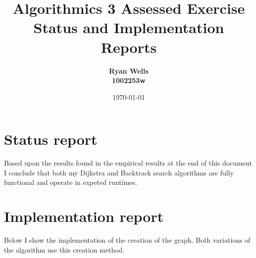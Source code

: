 \documentclass{article}
\title{Algorithmics 3 Assessed Exercise\\ 
Status and Implementation Reports}
\author{\bf Ryan Wells\\ \bf 1002253w}
\date{\today}
\begin{document}
\maketitle
\thispagestyle{empty}
\pagestyle{empty}

\section*{Status report}

Based upon the results found in the empirical results at the end of
this document I conclude that both my Dijkstra and Backtrack search
algorithms are fully functional and operate in expeted runtimes.
 
\section*{Implementation report}
Below I show  the implementation of the creation of the graph. Both
variations of the algorithm use this creation method.
\IncMargin{1em}
\end{document}
